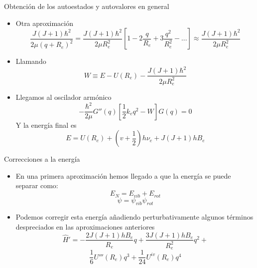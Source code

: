\documentclass[a4paper]{beamer}
\begin{document}
\begin{frame}{Obtención de los autoestados y autovalores en general}
\begin{itemize}
\item Otra aproximación
\begin{equation*}
\frac{J(J+1)\hbar^2}{2\mu (q+R_e)^2}=\frac{J(J+1)\hbar^2}{2\mu R_e^2}\left[1-2\frac{q}{R_e}+3\frac{q^2}{R_e^2}-...\right] \approx \frac{J(J+1)\hbar^2}{2\mu R_e^2}
\end{equation*}
\item Llamando
\begin{equation*}
W \equiv	E-U(R_e)-\frac{J(J+1)\hbar^2}{2\mu R_e^2}
\end{equation*}
\item Llegamos al oscilador armónico
\begin{equation*}
-\frac{\hbar^2}{2\mu}G''(q)\left[\frac{1}{2}k_eq^2-W\right] G(q)=0
\end{equation*}
Y la energía final es
\begin{equation*}
E=U(R_e)+\left(v+\frac{1}{2}\right)h\nu_e+J(J+1)hB_e
\end{equation*}
\end{itemize}
\end{frame}


\begin{frame}{Correcciones a la energía}
\begin{itemize}
\item En una primera aproximación hemos llegado a que la energía se puede separar como:
\begin{equation*}
E_N = E_{vib}+E_{rot}
\end{equation*}
\begin{equation*}
\psi=\psi_{vib}\psi_{rot}
\end{equation*}
\item Podemos corregir esta energía añadiendo perturbativamente algunos términos despreciados en las aproximaciones anteriores
\begin{equation*}
\hat H'=-\frac{2J(J+1)hB_e}{R_e}q +\frac{3J(J+1)hB_e}{R^2_e}q^2+
\end{equation*}
\begin{equation*}
\frac{1}{6}U'''(R_e)q^3+\frac{1}{24}U^{iv}(R_e)q^4
\end{equation*}
\end{itemize}
\end{frame}
\end{document}
